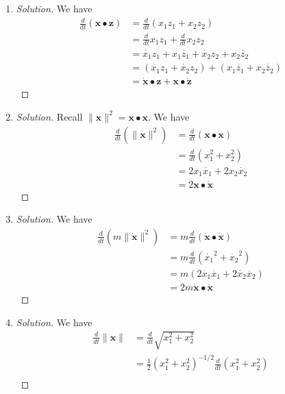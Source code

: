 \documentclass{article}
\begin{document}
\begin{enumerate}
	\item \begin{proof}[Solution]\let\qed\relax
		We have
		\begin{align*}
			\frac{d}{dt}(\mathbf{x}\bullet\mathbf{z})
			&= \frac{d}{dt}(x_1z_1 + x_2z_2)\\
			&= \frac{d}{dt}x_1z_1 + \frac{d}{dt}x_2z_2\\
			&= \dot{x_1}z_1 + x_1\dot{z_1} + \dot{x_2}z_2 + x_2\dot{z_2}\\
			&= (\dot{x_1}z_1 + \dot{x_2}z_2) + (x_1\dot{z_1} + x_2\dot{z_2})\\
			&= \dot{\mathbf{x}}\bullet\mathbf{z} + \mathbf{x}\bullet\dot{\mathbf{z}}
		\end{align*}
	\end{proof}
	\item \begin{proof}[Solution]\let\qed\relax
		Recall $\lVert \mathbf{x} \rVert^2 = \mathbf{x} \bullet \mathbf{x}$.
		We have
		\begin{align*}
			\frac{d}{dt}(\lVert\mathbf{x}\rVert^2)
			&= \frac{d}{dt}(\mathbf{x} \bullet \mathbf{x})\\
			&= \frac{d}{dt}(x_1^2 + x_2^2)\\
			&= 2x_1\dot{x_1} + 2x_2\dot{x_2}\\
			&= 2\mathbf{x}\bullet \dot{\mathbf{x}}
		\end{align*}
	\end{proof}
	\item \begin{proof}[Solution]\let\qed\relax
		We have
		\begin{align*}
			\frac{d}{dt}(m\lVert\dot{\mathbf{x}}\rVert^2)
			&= m\frac{d}{dt}(\dot{\mathbf{x}} \bullet \dot{\mathbf{x}})\\
			&= m\frac{d}{dt}(\dot{x_1}^2 + \dot{x_2}^2)\\
			&= m(2\dot{x_1}\ddot{x_1} + 2\dot{x_2}\ddot{x_2})\\
			&= 2m\dot{\mathbf{x}}\bullet \ddot{\mathbf{x}}
		\end{align*}
	\end{proof}
	\item \begin{proof}[Solution]\let\qed\relax
		We have
		\begin{align*}
			\frac{d}{dt}\lVert\mathbf{x}\rVert
			&= \frac{d}{dt}\sqrt{x_1^2 + x_2^2}\\
			&= \frac{1}{2}(x_1^2 + x_2^2)^{-1/2}\frac{d}{dt}(x_1^2 + x_2^2)\\

\end{align*}
\end{proof}
\end{enumerate}
\end{document}
